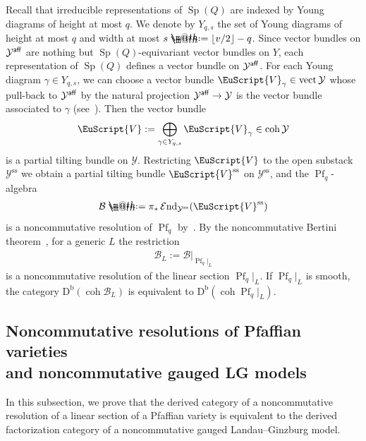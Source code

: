 \documentclass[10pt,a4paper]{amsart}
\makeatletter
\newcommand*{\defeq}{\mathrel{\rlap{%
 \raisebox{0.3ex}{$\m@th\cdot$}}%
 \raisebox{-0.3ex}{$\m@th\cdot$}}%
 =}
\numberwithin{equation}{section}
\newcommand{\cEnd}{\operatorname{{\mathcal E}nd}}
\newcommand{\coh}{\operatorname{coh}}
\newcommand{\vect}{\operatorname{vect}}
\newcommand{\Db}{\operatorname{D^b}}
\newcommand{\Pf}{\operatorname{Pf}}
\newcommand{\Sp}{\operatorname{Sp}}
\newcommand{\aff}{\operatorname{\sf aff}}
\newcommand{\stab}{\operatorname{ss}}
\newcommand{\cB}{\mathcal{B}}
\newcommand{\cY}{\mathcal{Y}}
\newcommand{\scrV}{\EuScript{V}}
\newcommand{\rest}{\!|_L}
\makeatother
\begin{document}
Recall that irreducible representations of $\Sp(Q)$ are indexed by Young diagrams of height at most $q$. We denote by $Y_{q,s}$ the set of Young diagrams of height at most $q$ and width at most $s\defeq\lfloor v/2\rfloor-q$. Since vector bundles on $\cY^{\aff}$ are nothing but $\Sp(Q)$-equivariant vector bundles on $Y$, each representation of $\Sp(Q)$ defines a vector bundle
 on $\cY^{\aff}$. For each Young diagram $\gamma\in Y_{q,s}$, we can choose a vector bundle $\scrV_{\gamma}\in \vect\cY$ whose pull-back to $\cY^{\aff}$ by the natural projection $\cY^{\aff}\to \cY$ is the vector bundle associated to $\gamma$ (see~\cite[Section~2.4]{rs}). Then the vector bundle
\begin{gather*}
\scrV:=\bigoplus_{\gamma\in Y_{q,s}}\scrV_{\gamma}\in \coh\cY
\end{gather*}
is a partial tilting bundle on $\cY$. Restricting $\scrV$ to the open substack $\cY^{\stab}$ we obtain a partial tilting bundle
$\scrV^{\stab}$ on $\cY^{\stab}$, and the ${\Pf_q}$-algebra
\begin{gather*}
\cB\defeq\pi_*\cEnd_{\cY^{\stab}}(\scrV^{\stab})
\end{gather*}
is a noncommutative resolution of $\Pf_q$ by~\cite[Section~5]{svdb}.
By the noncommutative Bertini theorem~\cite{rsv}, for a generic $L$ the restriction
\begin{gather*}
\cB_L:=\cB|_{\Pf_q\rest}
\end{gather*}
 is a noncommutative resolution of the linear section $\Pf_q\rest$. If $\Pf_q\rest$ is smooth, the category $\Db (\coh \cB_L )$ is equivalent to $\Db (\coh \Pf_q\rest )$.

 \subsection[Noncommutative resolutions of Pfaffian varieties and noncommutative gauged LG models]
 {Noncommutative resolutions of Pfaffian varieties \\and noncommutative gauged LG models}

 In this subsection, we prove that the derived category of a noncommutative resolution of a linear section of a Pfaffian variety is equivalent to the derived factorization category of a noncommutative gauged Landau--Ginzburg model.
\end{document}
